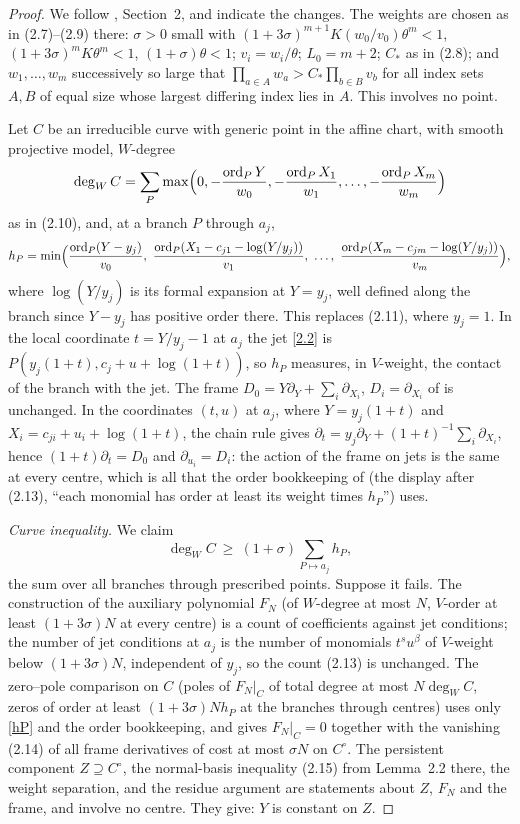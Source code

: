 \documentclass[11pt]{amsart}
\newcommand{\ord}{\operatorname{ord}}
\newcommand{\degW}{\deg_W}
\begin{document}
\begin{proof}
We follow \cite{OAI}, Section~2, and indicate the changes. The weights are chosen as in (2.7)--(2.9) there: $\sigma>0$ small with $(1+3\sigma)^{m+1}K(w_0/v_0)\theta^m<1$, $(1+3\sigma)^mK\theta^m<1$, $(1+\sigma)\theta<1$; $v_i=w_i/\theta$; $L_0=m+2$; $C_*$ as in (2.8); and $w_1,\dots,w_m$ successively so large that $\prod_{a\in A}w_a>C_*\prod_{b\in B}v_b$ for all index sets $A,B$ of equal size whose largest differing index lies in $A$. This involves no point.

Let $C$ be an irreducible curve with generic point in the affine chart, with smooth projective model, $W$-degree
\[
\degW C=\sum_P\max\Bigl(0,-\frac{\ord_PY}{w_0},-\frac{\ord_PX_1}{w_1},\dots,-\frac{\ord_PX_m}{w_m}\Bigr)
\]
as in (2.10), and, at a branch $P$ through $a_j$,
\begin{equation}\label{hP}
h_P=\min\Bigl(\frac{\ord_P(Y-y_j)}{v_0},\ \frac{\ord_P(X_1-c_{j1}-\log(Y/y_j))}{v_1},\ \dots,\ \frac{\ord_P(X_m-c_{jm}-\log(Y/y_j))}{v_m}\Bigr),
\end{equation}
where $\log(Y/y_j)$ is its formal expansion at $Y=y_j$, well defined along the branch since $Y-y_j$ has positive order there. This replaces (2.11), where $y_j=1$. In the local coordinate $t=Y/y_j-1$ at $a_j$ the jet \eqref{2.2} is $P(y_j(1+t),c_j+u+\log(1+t))$, so $h_P$ measures, in $V$-weight, the contact of the branch with the jet. The frame $D_0=Y\partial_Y+\sum_i\partial_{X_i}$, $D_i=\partial_{X_i}$ of \cite{OAI} is unchanged. In the coordinates $(t,u)$ at $a_j$, where $Y=y_j(1+t)$ and $X_i=c_{ji}+u_i+\log(1+t)$, the chain rule gives $\partial_t=y_j\partial_Y+(1+t)^{-1}\sum_i\partial_{X_i}$, hence $(1+t)\partial_t=D_0$ and $\partial_{u_i}=D_i$: the action of the frame on jets is the same at every centre, which is all that the order bookkeeping of \cite{OAI} (the display after (2.13), ``each monomial has order at least its weight times $h_P$'') uses.

\emph{Curve inequality.} We claim
\begin{equation}\label{2.12}
\degW C\ \ge\ (1+\sigma)\sum_{P\mapsto a_j}h_P ,
\end{equation}
the sum over all branches through prescribed points. Suppose it fails. The construction of the auxiliary polynomial $F_N$ (of $W$-degree at most $N$, $V$-order at least $(1+3\sigma)N$ at every centre) is a count of coefficients against jet conditions; the number of jet conditions at $a_j$ is the number of monomials $t^su^\beta$ of $V$-weight below $(1+3\sigma)N$, independent of $y_j$, so the count (2.13) is unchanged. The zero--pole comparison on $C$ (poles of $F_N|_C$ of total degree at most $N\degW C$, zeros of order at least $(1+3\sigma)Nh_P$ at the branches through centres) uses only \eqref{hP} and the order bookkeeping, and gives $F_N|_C=0$ together with the vanishing (2.14) of all frame derivatives of cost at most $\sigma N$ on $C^\circ$. The persistent component $Z\supseteq C^\circ$, the normal-basis inequality (2.15) from Lemma~2.2 there, the weight separation, and the residue argument are statements about $Z$, $F_N$ and the frame, and involve no centre. They give: $Y$ is constant on $Z$.


\end{proof}
\end{document}
